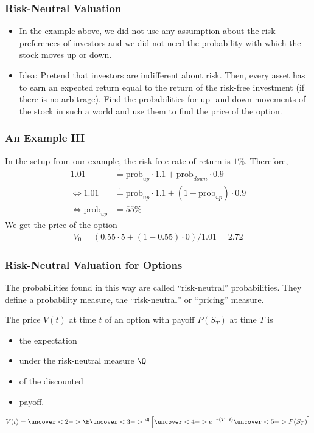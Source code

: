 \begin{frame}[fragile]
\frametitle{Risk-Neutral Valuation}
\begin{itemize}
  \item In the example above, we did not use any assumption about the risk
  preferences of investors and we did not need the probability with which the
  stock moves up or down.
  \item Idea: Pretend that investors are indifferent about risk. Then, every
  asset has to earn an expected return equal to the return of the risk-free
  investment (if there is no arbitrage). Find the probabilities for up- and
  down-movements of the stock in such a world and use them to find the price of
  the option.
\end{itemize}
\end{frame}

\begin{frame}[fragile]
\frametitle{An Example III}
In the setup from our example, the risk-free rate of return is $1\%$. Therefore,
\begin{align*}
  1.01 &\stackrel{!}{=} \text{prob}_{up} \cdot 1.1 + \text{prob}_{down} \cdot 0.9 \\
  \Leftrightarrow 1.01 &\stackrel{!}{=} \text{prob}_{up} \cdot 1.1 + (1-\text{prob}_{up})
  \cdot 0.9 \\
  \Leftrightarrow \text{prob}_{up} &= 55\%
\end{align*}
We get the price of the option
\begin{align*}
  V_0 = (0.55 \cdot 5 + (1-0.55)\cdot 0)/1.01 = 2.72
\end{align*}
\end{frame}

\begin{frame}[fragile]
\frametitle{Risk-Neutral Valuation for Options}
The probabilities found in this way are called ``risk-neutral'' probabilities.
They define a probability measure, the ``risk-neutral'' or ``pricing''
measure.\\
\vspace{0.5cm}

The price $V(t)$ at time $t$ of an option with payoff $P(S_T)$ at time $T$ is
\begin{itemize}
  \item<2-> the expectation
  \item<3-> under the risk-neutral measure $\Q$
  \item<4-> of the discounted
  \item<5-> payoff.
\end{itemize}
\begin{block}{}
\begin{align*}
  V(t) = \uncover<2->{\E\uncover<3->{^\Q}\left[ \uncover<4->{e^{-r(T-t)}}
  \uncover<5->{P(S_T)}\right]}
\end{align*}
\end{block}
\end{frame}

